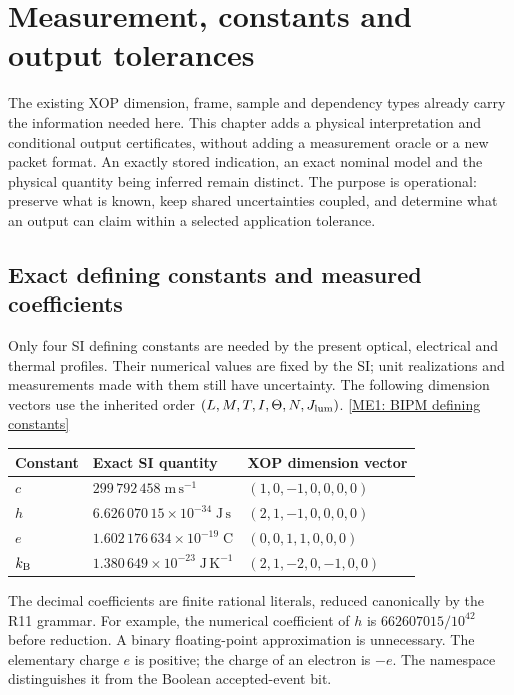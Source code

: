 \section{Measurement, constants and output tolerances}
\label{r13-measurement-core}

The existing XOP dimension, frame, sample and dependency types already carry
the information needed here. This chapter adds a physical interpretation and
conditional output certificates, without adding a measurement oracle or a new
packet format. An exactly stored indication, an exact nominal model and the
physical quantity being inferred remain distinct. The purpose is operational:
preserve what is known, keep shared uncertainties coupled, and determine what
an output can claim within a selected application tolerance.

\subsection{Exact defining constants and measured coefficients}
\label{r13-measurement-constants}

Only four SI defining constants are needed by the present optical, electrical
and thermal profiles. Their numerical values are fixed by the SI; unit
realizations and measurements made with them still have uncertainty.
The following dimension vectors use the inherited order
$(L,M,T,I,\Theta,N,J_{\rm lum})$.
\href{https://www.bipm.org/en/measurement-units/si-defining-constants}{[ME1: BIPM defining constants]}

\begin{center}\small
\begin{tabularx}{\linewidth}{P{.11\linewidth}P{.45\linewidth}Y}
\toprule
Constant & Exact SI quantity & XOP dimension vector\\
\midrule
$c$ & $299\,792\,458\;\mathrm{m\,s^{-1}}$ & $(1,0,-1,0,0,0,0)$\\
$h$ & $6.626\,070\,15\times10^{-34}\;\mathrm{J\,s}$ & $(2,1,-1,0,0,0,0)$\\
$e$ & $1.602\,176\,634\times10^{-19}\;\mathrm{C}$ & $(0,0,1,1,0,0,0)$\\
$k_{\rm B}$ & $1.380\,649\times10^{-23}\;\mathrm{J\,K^{-1}}$ & $(2,1,-2,0,-1,0,0)$\\
\bottomrule
\end{tabularx}\end{center}

The decimal coefficients are finite rational literals, reduced canonically by
the R11 grammar. For example, the numerical coefficient of $h$ is
$662607015/10^{42}$ before reduction. A binary floating-point approximation is
unnecessary. The elementary charge $e$ is positive; the charge of an electron
is $-e$. The namespace distinguishes it from the Boolean accepted-event bit.

